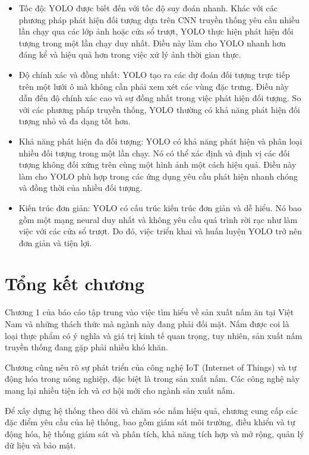 \begin{itemize}
    \item Tốc độ: YOLO được biết đến với tốc độ suy đoán nhanh. Khác với các phương pháp phát hiện đối tượng dựa trên CNN truyền thống yêu cầu nhiều lần chạy qua các lớp ảnh hoặc cửa sổ trượt, YOLO thực hiện phát hiện đối tượng trong một lần chạy duy nhất. Điều này làm cho YOLO nhanh hơn đáng kể và hiệu quả hơn trong việc xử lý ảnh thời gian thực.
    \item Độ chính xác và đồng nhất: YOLO tạo ra các dự đoán đối tượng trực tiếp trên một lưới ô mà không cần phải xem xét các vùng đặc trưng. Điều này dẫn đến độ chính xác cao và sự đồng nhất trong việc phát hiện đối tượng. So với các phương pháp truyền thống, YOLO thường có khả năng phát hiện đối tượng nhỏ và đa dạng tốt hơn.
    \item Khả năng phát hiện đa đối tượng: YOLO có khả năng phát hiện và phân loại nhiều đối tượng trong một lần chạy. Nó có thể xác định và định vị các đối tượng không đối xứng trên cùng một hình ảnh một cách hiệu quả. Điều này làm cho YOLO phù hợp trong các ứng dụng yêu cầu phát hiện nhanh chóng và đồng thời của nhiều đối tượng.
    \item Kiến trúc đơn giản: YOLO có cấu trúc kiến trúc đơn giản và dễ hiểu. Nó bao gồm một mạng neural duy nhất và không yêu cầu quá trình rời rạc như làm việc với các cửa sổ trượt. Do đó, việc triển khai và huấn luyện YOLO trở nên đơn giản và tiện lợi.
\end{itemize}

\section{Tổng kết chương}

Chương 1 của báo cáo tập trung vào việc tìm hiểu về sản xuất nấm ăn tại Việt Nam và những thách thức mà ngành này đang phải đối mặt. Nấm được coi là loại thực phẩm có ý nghĩa và giá trị kinh tế quan trọng, tuy nhiên, sản xuất nấm truyền thống đang gặp phải nhiều khó khăn.

Chương cũng nêu rõ sự phát triển của công nghệ IoT (Internet of Things) và tự động hóa trong nông nghiệp, đặc biệt là trong sản xuất nấm. Các công nghệ này mang lại nhiều tiện ích và cơ hội mới cho ngành sản xuất nấm.

Để xây dựng hệ thống theo dõi và chăm sóc nấm hiệu quả, chương cung cấp các đặc điểm yêu cầu của hệ thống, bao gồm giám sát môi trường, điều khiển và tự động hóa, hệ thống giám sát và phân tích, khả năng tích hợp và mở rộng, quản lý dữ liệu và bảo mật.

